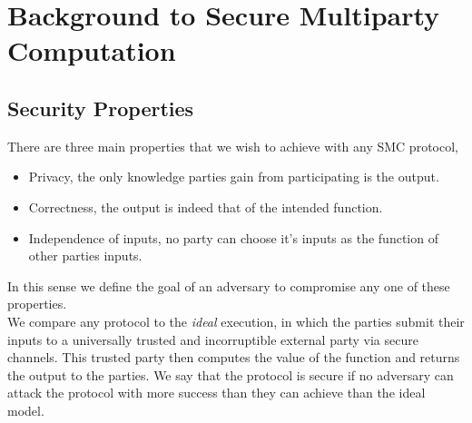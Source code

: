 \documentclass[a4paper,11pt]{article}
\begin{document}





	\section{Background to Secure Multiparty Computation} \label{sec:BG_toSMC}
		\subsection{Security Properties} \label{sub:SecurityProperties}
			There are three main properties that we wish to achieve with any SMC protocol,
			\begin{itemize}
				\item Privacy, the only knowledge parties gain from participating is the output.
				\item Correctness, the output is indeed that of the intended function.
				\item Independence of inputs, no party can choose it's inputs as the function of other parties inputs.
			\end{itemize}

			In this sense we define the goal of an adversary to compromise any one of these properties.\\

			We compare any protocol to the \emph{ideal} execution, in which the parties submit their inputs to a universally trusted and incorruptible external party via secure channels. This trusted party then computes the value of the function and returns the output to the parties. We say that the protocol is secure if no adversary can attack the protocol with more success than they can achieve than the ideal model.
\end{document}
